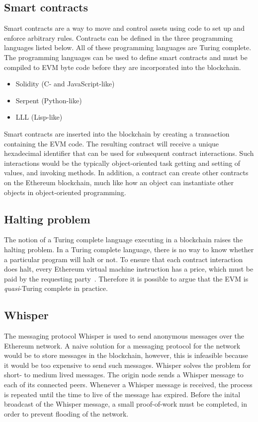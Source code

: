 \subsection{Smart contracts}
\label{sec:tech:contracts}
Smart contracts are a way to move and control assets using code to set up and enforce arbitrary rules. Contracts can be defined in the three programming languages listed below. All of these programming languages are Turing complete. The programming languages can be used to define smart contracts and must be compiled to EVM byte code before they are incorporated into the blockchain.

\begin{itemize}
    \item Solidity (C- and JavaScript-like)
    \item Serpent (Python-like)
    \item LLL (Lisp-like)
\end{itemize}

Smart contracts are inserted into the blockchain by creating a transaction containing the EVM code. The resulting contract will receive a unique hexadecimal identifier that can be used for subsequent contract interactions. Such interactions would be the typically object-oriented task getting and setting of values, and invoking methods. In addition, a contract can create other contracts on the Ethereum blockchain, much like how an object can instantiate other objects in object-oriented programming.

\subsection{Halting problem}
The notion of a Turing complete language executing in a blockchain raises the halting problem. In a Turing complete language, there is no way to know whether a particular program will halt or not. To ensure that each contract interaction does halt, every Ethereum virtual machine instruction has a price, which must be paid by the requesting party~\cite{ethereum:yellow}. Therefore it is possible to argue that the EVM is \emph{quasi}-Turing complete in practice.

\subsection{Whisper}
The messaging protocol Whisper is used to send anonymous messages over the Ethereum network. A naive solution for a messaging protocol for the network would be to store messages in the blockchain, however, this is infeasible because it would be too expensive to send such messages. Whisper solves the problem for short- to medium lived messages. The origin node sends a Whisper message to each of its connected peers. Whenever a Whisper message is received, the process is repeated until the time to live of the message has expired. Before the inital broadcast of the Whisper message, a small proof-of-work must be completed, in order to prevent flooding of the network.

